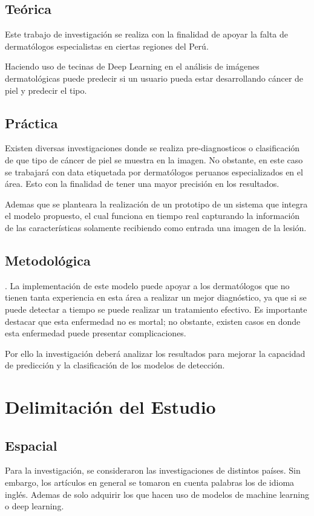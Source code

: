\subsection{Teórica}
Este trabajo de investigación se realiza con la finalidad de apoyar la falta de dermatólogos especialistas en ciertas regiones del Perú.

Haciendo uso de tecinas de Deep Learning en el análisis de imágenes dermatológicas puede predecir si un usuario pueda estar desarrollando cáncer de piel y predecir el tipo. 


\subsection{Práctica}
Existen diversas investigaciones donde se realiza pre-diagnosticos o clasificación de que tipo de cáncer de piel se muestra en la imagen. No obstante, en este caso se trabajará con data etiquetada por dermatólogos peruanos especializados en el área. Esto con la finalidad de tener una mayor precisión en los resultados.

Ademas que se planteara la realización de un prototipo de un sistema que integra el modelo propuesto, el cual funciona en tiempo real capturando la información de las características solamente recibiendo como entrada una imagen de la lesión. 


\subsection{Metodológica}. 
La implementación de este modelo puede apoyar a los dermatólogos que no tienen tanta experiencia en esta área a realizar un mejor diagnóstico, ya que si se puede detectar a tiempo se puede realizar un tratamiento efectivo. Es importante destacar que esta enfermedad no es mortal; no obstante, existen casos en donde esta enfermedad puede presentar complicaciones. 

Por ello la investigación deberá analizar los resultados para mejorar la capacidad de predicción y la clasificación de los modelos de detección.

\section{Delimitación del Estudio}

\subsection{Espacial}
Para la investigación, se consideraron las investigaciones de distintos países. Sin embargo, los artículos en general se tomaron en cuenta palabras los de idioma inglés. Ademas de solo adquirir los que hacen uso de modelos de machine learning o deep learning.

